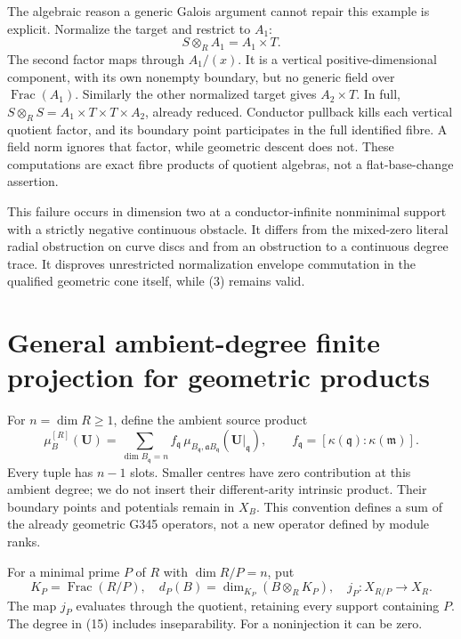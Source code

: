 The algebraic reason a generic Galois argument cannot repair this
example is explicit. Normalize the target and restrict to \(A_1\):
\[
 S\otimes_R A_1=A_1\times T.
\]
The second factor maps through \(A_1/(x)\). It is a vertical
positive-dimensional component, with its own nonempty boundary,
but no generic field over \(\operatorname{Frac}(A_1)\).
Similarly the other normalized target gives \(A_2\times T\).
In full, \(S\otimes_R S=A_1\times T\times T\times A_2\),
already reduced. Conductor pullback kills each vertical quotient
factor, and its boundary point participates in the full identified
fibre. A field norm ignores that factor, while geometric descent
does not. These computations are exact fibre products of quotient
algebras, not a flat-base-change assertion.

This failure occurs in dimension two at a conductor-infinite
nonminimal support with a strictly negative continuous obstacle.
It differs from the mixed-zero literal radial obstruction on
curve discs and from an obstruction to a continuous degree trace.
It disproves unrestricted normalization envelope commutation in the
qualified geometric cone itself, while (3) remains valid.

\section{General ambient-degree finite projection for geometric products}
\label{sec:projection}
For \(n=\dim R\geq1\), define the ambient source product
\[
 \mu_B^{[R]}(\boldsymbol U)
   =\sum_{\dim B_{\mathfrak q}=n}
       f_{\mathfrak q}\,\mu_{B_{\mathfrak q},\mathfrak aB_{\mathfrak q}}
                          (\boldsymbol U|_{\mathfrak q}),\qquad
 f_{\mathfrak q}=[\kappa(\mathfrak q):\kappa(\mathfrak m)].
                                                               \tag{14}
\]
Every tuple has \(n-1\) slots. Smaller centres have zero contribution
at this ambient degree; we do not insert their different-arity
intrinsic product. Their boundary points and potentials remain in
\(X_B\). This convention defines a sum of the already geometric
G345 operators, not a new operator defined by module ranks.

For a minimal prime \(P\) of \(R\) with \(\dim R/P=n\), put
\[
 K_P=\operatorname{Frac}(R/P),\quad
 d_P(B)=\dim_{K_P}(B\otimes_R K_P),\quad
 j_P:X_{R/P}\longrightarrow X_R .
                                                               \tag{15}
\]
The map \(j_P\) evaluates through the quotient, retaining every
support containing \(P\). The degree in (15) includes inseparability.
For a noninjection it can be zero.

